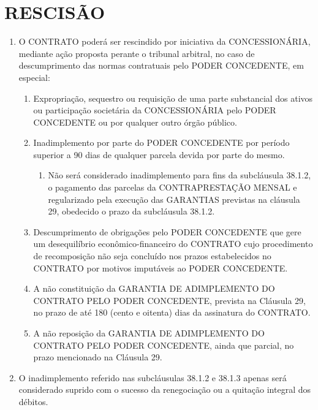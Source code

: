 \documentclass[a4paper,11pt]{report} %
\begin{document}
\section{RESCISÃO}
\label{sec:4BRU}

\begin{enumerate}
\item \label{itm:35BR} O CONTRATO poderá ser rescindido por iniciativa da CONCESSIONÁRIA, mediante ação proposta perante o tribunal arbitral, no caso de descumprimento das normas contratuais pelo PODER CONCEDENTE, em especial:

\begin{enumerate}[label*=\arabic*.]
\item \label{itm:AETL} Expropriação, sequestro ou requisição de uma parte substancial dos ativos ou participação societária da CONCESSIONÁRIA pelo PODER CONCEDENTE ou por qualquer outro órgão público.

\item \label{itm:SMBZ} Inadimplemento por parte do PODER CONCEDENTE por período superior a 90 dias de qualquer parcela devida por parte do mesmo.

\begin{enumerate}[label*=\arabic*.]
\item \label{itm:77HD} Não será considerado inadimplemento para fins da subcláusula 38.1.2, o pagamento das parcelas da CONTRAPRESTAÇÃO MENSAL e regularizado pela execução das GARANTIAS previstas na cláusula 29, obedecido o prazo da subcláusula 38.1.2.
\end{enumerate}

\item \label{itm:NQT6} Descumprimento de obrigações pelo PODER CONCEDENTE que gere um desequilíbrio econômico-financeiro do CONTRATO cujo procedimento de recomposição não seja concluído nos prazos estabelecidos no CONTRATO por motivos imputáveis ao PODER CONCEDENTE.

\item \label{itm:FCV3} A não constituição da GARANTIA DE ADIMPLEMENTO DO CONTRATO PELO PODER CONCEDENTE, prevista na Cláusula 29, no prazo de até 180 (cento e oitenta) dias da assinatura do CONTRATO.

\item \label{itm:PKVW} A não reposição da GARANTIA DE ADIMPLEMENTO DO CONTRATO PELO PODER CONCEDENTE, ainda que parcial, no prazo mencionado na Cláusula 29. 
\end{enumerate}

\item \label{itm:7K7R} O inadimplemento referido nas subcláusulas 38.1.2 e 38.1.3 apenas será considerado suprido com o sucesso da renegociação ou a quitação integral dos débitos.


\end{enumerate}
\end{document}
